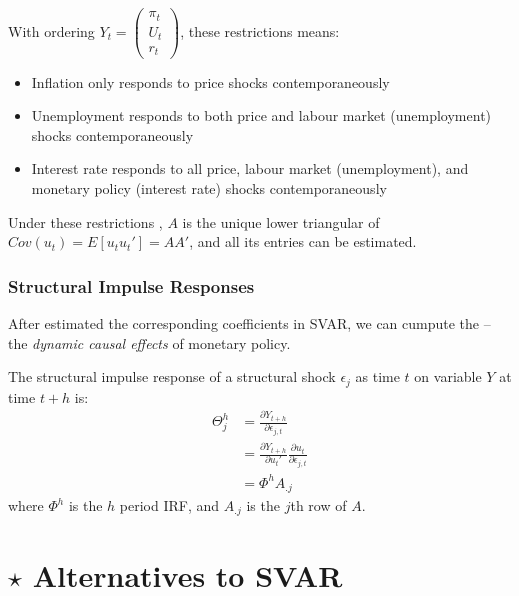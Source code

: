             With ordering $Y_t=\begin{pmatrix}
                \pi_t\\
                U_t\\
                r_t
            \end{pmatrix}$, these restrictions means:
            \begin{itemize}
                \item Inflation only responds to price shocks contemporaneously
                \item Unemployment responds to both price and labour market (unemployment) shocks contemporaneously
                \item Interest rate responds to all price, labour market (unemployment), and monetary policy (interest rate) shocks contemporaneously
            \end{itemize}
            
            Under these restrictions , $A$ is the unique lower triangular  of $Cov(u_t)=E[u_tu_t']=AA'$, and all its entries can be estimated.

        \subsubsection{Structural Impulse Responses}

            After estimated the corresponding coefficients in SVAR, we can cumpute the  -- the \emph{dynamic causal effects} of monetary policy.

            The structural impulse response of a structural shock $\epsilon_j$ as time $t$ on variable $Y$ at time $t+h$ is:
            \begin{align*}
                \Theta_j^h &= \frac{\partial Y_{t+h}}{\partial \epsilon_{j,t}}\\
                &= \frac{\partial Y_{t+h}}{\partial u_t'}\frac{\partial u_t}{\partial \epsilon_{j,t}} \tag{Product Rule}\\
                &=\Phi^h A_{.j}
            \end{align*}
            where $\Phi^h$ is the $h$ period IRF, and $A_{.j}$ is the $j$th row of $A$.
            
    \section{$\star$ Alternatives to SVAR}
    
